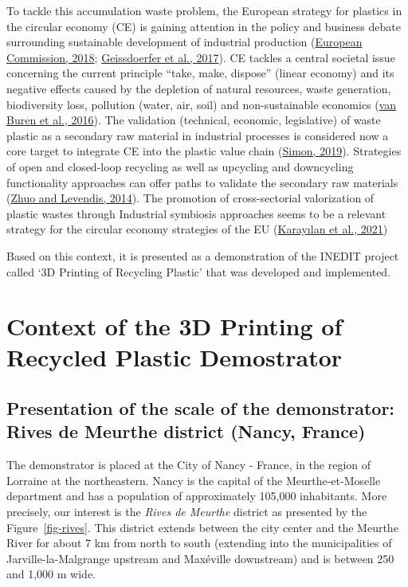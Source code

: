 \documentclass[
  11pt,
]{article}
\begin{document}
To tackle this accumulation waste problem, the European strategy for
plastics in the circular economy (CE) is gaining attention in the policy
and business debate surrounding sustainable development of industrial
production (\protect\hyperlink{ref-EC2018}{European Commission, 2018};
\protect\hyperlink{ref-Geissdoerfer2017}{Geissdoerfer et al., 2017}). CE
tackles a central societal issue concerning the current principle
``take, make, dispose'' (linear economy) and its negative effects caused
by the depletion of natural resources, waste generation, biodiversity
loss, pollution (water, air, soil) and non-sustainable economics
(\protect\hyperlink{ref-VanBuren2016}{van Buren et al., 2016}). The
validation (technical, economic, legislative) of waste plastic as a
secondary raw material in industrial processes is considered now a core
target to integrate CE into the plastic value chain
(\protect\hyperlink{ref-Simon2019}{Simon, 2019}). Strategies of open and
closed-loop recycling as well as upcycling and downcycling functionality
approaches can offer paths to validate the secondary raw materials
(\protect\hyperlink{ref-Zhuo2014}{Zhuo and Levendis, 2014}). The
promotion of cross-sectorial valorization of plastic wastes through
Industrial symbiosis approaches seems to be a relevant strategy for the
circular economy strategies of the EU
(\protect\hyperlink{ref-Karaylan2021}{Karayılan et al., 2021})

Based on this context, it is presented as a demonstration of the INEDIT
project called `3D Printing of Recycling Plastic' that was developed and
implemented.

\newpage

\hypertarget{sec-context}{%
\section{Context of the 3D Printing of Recycled Plastic
Demostrator}\label{sec-context}}

\hypertarget{presentation-of-the-scale-of-the-demonstrator-rives-de-meurthe-district-nancy-france}{%
\subsection{Presentation of the scale of the demonstrator: Rives de
Meurthe district (Nancy,
France)}\label{presentation-of-the-scale-of-the-demonstrator-rives-de-meurthe-district-nancy-france}}

The demonstrator is placed at the City of Nancy - France, in the region
of Lorraine at the northeastern. Nancy is the capital of the
Meurthe-et-Moselle department and has a population of approximately
105,000 inhabitants. More precisely, our interest is the \emph{Rives de
Meurthe} district as presented by the Figure~\ref{fig-rives}. This
district extends between the city center and the Meurthe River for about
7 km from north to south (extending into the municipalities of
Jarville-la-Malgrange upstream and Maxéville downstream) and is between
250 and 1,000 m wide.
\end{document}

